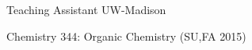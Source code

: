 

\begin{cventries}

  \cventry
    {Teaching Assistant} %
    {UW-Madison} %
    {} %
    {} %
    {
      \begin{cvitems} %
        \item {Chemistry 344: Organic Chemistry (SU,FA 2015)}        
      \end{cvitems}
    }
    
\end{cventries}